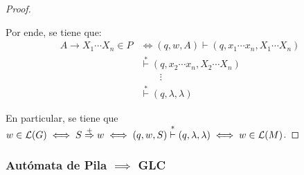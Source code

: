 \begin{proof}
\begin{itemize}
            Por ende, se tiene que:
            $$
            \begin{aligned}
                A \to X_1 \cdots X_n \in P & \iff (q, w, A) \vdash (q, x_1 \cdots x_n, X_1 \cdots X_n) \\
                & \overset{*}{\vdash} (q, x_2 \cdots x_n, X_2 \cdots X_n) \\
                & \qquad \vdots \\
                & \overset{*}{\vdash} (q, \lambda, \lambda)
            \end{aligned}
            $$
    \end{itemize}

    En particular, se tiene que $w \in \mathcal{L}(G) \iff S \overset{+}{\Rightarrow} w \iff (q, w, S) \overset{*}{\vdash} (q, \lambda, \lambda) \iff w \in \mathcal{L}(M)$.
\end{proof}

\subsubsection{Autómata de Pila $\implies$ GLC}

